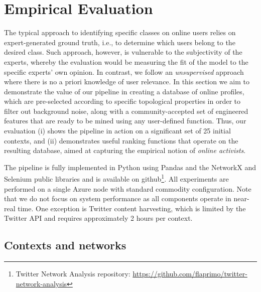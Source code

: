 \section{Empirical Evaluation} \label{sec:evaluation}

The typical approach to identifying specific classes on online users relies on expert-generated ground truth, i.e., to determine which users belong to the desired class. 
Such approach, however, is vulnerable to the subjectivity of the experts, whereby the evaluation would be measuring the fit of the model to the specific experts' own opinion. 
In contrast, we follow an \textit{unsupervised} approach where there is no a priori knowledge of user relevance.  
In this section we aim to demonstrate the value of our pipeline in creating a database of online profiles, which are pre-selected according to specific topological properties in order to filter out background noise,  along with a community-accepted set of engineered features that are ready to be mined using any user-defined function.
%
Thus, our evaluation (i) shows the pipeline in action on a significant set of 25 initial contexts, and (ii) demonstrates useful ranking functions that operate on the resulting database, aimed at capturing the empirical notion of  \textit{online activists}.

The pipeline is fully implemented in Python using Pandas and the NetworkX and Selenium public libraries and is available on github\footnote{Twitter Network Analysis repository: \url{https://github.com/flaprimo/twitter-network-analysis}}. 
All experiments are performed on a single Azure node with standard commodity configuration.
Note that we do not focus on system performance as all components operate in near-real time. One exception is  Twitter content harvesting, which is limited by the Twitter API and requires approximately 2 hours per context.

\subsection{Contexts and networks} \label{sec:contexts}
 
